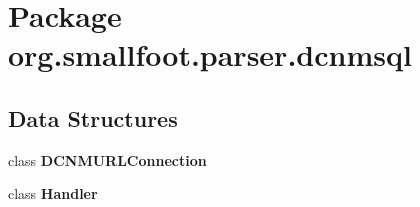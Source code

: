 \section{Package org.\+smallfoot.\+parser.\+dcnmsql}
\label{namespaceorg_1_1smallfoot_1_1parser_1_1dcnmsql}
\subsection*{Data Structures}
\begin{DoxyCompactItemize}
\item 
class {\bf D\+C\+N\+M\+U\+R\+L\+Connection}
\item 
class {\bf Handler}
\end{DoxyCompactItemize}
